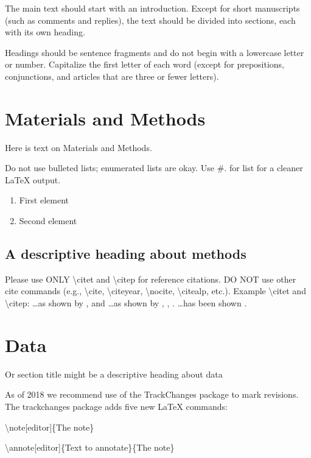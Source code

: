 \documentclass[draft,linenumbers]{agujournal2018}
\begin{document}
The main text should start with an introduction. Except for short
manuscripts (such as comments and replies), the text should be divided
into sections, each with its own heading.

Headings should be sentence fragments and do not begin with a lowercase
letter or number. Capitalize the first letter of each word (except for
prepositions, conjunctions, and articles that are three or fewer
letters).

\section{Materials and Methods}

Here is text on Materials and Methods.

Do not use bulleted lists; enumerated lists are okay. Use \#. for list
for a cleaner LaTeX output.

\begin{enumerate}
\item
  First element
\item
  Second element
\end{enumerate}

\subsection{A descriptive heading about methods}

Please use ONLY \textbackslash citet and \textbackslash citep for
reference citations. DO NOT use other cite commands (e.g.,
\textbackslash cite, \textbackslash citeyear, \textbackslash nocite,
\textbackslash citealp, etc.). Example \textbackslash citet and
\textbackslash citep: \ldots as shown by \citet{Levitus2012},
\citet{Nuncio2011} and \citet{Raphael2004} \ldots as shown by
\citep{Levitus2012}, \citep{Nuncio2011}, \citep{Raphael2004}. \ldots has
been shown \citep[e.g.,][]{Levitus2012, Nuncio2011, Raphael2004}.

\section{Data}

Or section title might be a descriptive heading about data

As of 2018 we recommend use of the TrackChanges package to mark
revisions. The trackchanges package adds five new LaTeX commands:

\textbackslash note{[}editor{]}\{The note\}

\textbackslash annote{[}editor{]}\{Text to annotate\}\{The note\}
\end{document}
